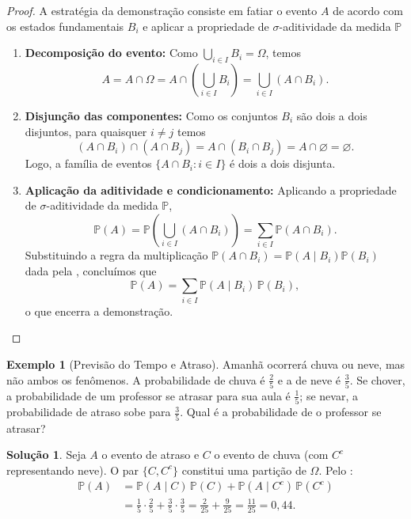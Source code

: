 \documentclass[12pt,portuguese]{article}
\theoremstyle{definition}
\newtheorem{example}[example]{Exemplo}
\newtheorem*{solution}{Solução}
\begin{document}
\begin{proof}
A estratégia da demonstração consiste em fatiar o evento \(A\) de acordo com os estados fundamentais \(B_i\) e aplicar a propriedade de $\sigma$-aditividade da medida \(\mathbb{P}\)

\begin{enumerate}[label=\textbf{Passo \arabic*:},leftmargin=*]
  \item \textbf{Decomposição do evento:} Como \(\bigcup_{i \in I} B_i = \Omega\), temos
  \[
    A = A \cap \Omega = A \cap \left(\bigcup_{i \in I} B_i\right) = \bigcup_{i \in I} (A \cap B_i).
  \]
  \item \textbf{Disjunção das componentes:} Como os conjuntos \(B_i\) são dois a dois disjuntos, para quaisquer \(i \ne j\) temos
  \[
    (A \cap B_i) \cap (A \cap B_j) = A \cap (B_i \cap B_j) = A \cap \varnothing = \varnothing.
  \]
  Logo, a família de eventos \(\{A \cap B_i : i \in I\}\) é dois a dois disjunta.
  \item \textbf{Aplicação da aditividade e condicionamento:} Aplicando a propriedade de $\sigma$-aditividade da medida \(\mathbb{P}\),
  \[
    \mathbb{P}(A) = \mathbb{P}\left(\bigcup_{i \in I} (A \cap B_i)\right) = \sum_{i \in I} \mathbb{P}(A \cap B_i).
  \]
  Substituindo a regra da multiplicação \(\mathbb{P}(A \cap B_i) = \mathbb{P}(A \mid B_i)\mathbb{P}(B_i)\) dada pela , concluímos que
  \[
    \mathbb{P}(A) = \sum_{i \in I} \mathbb{P}(A \mid B_i)\,\mathbb{P}(B_i),
  \]
  o que encerra a demonstração.
\end{enumerate}
\end{proof}

\begin{example}[Previsão do Tempo e Atraso]\label{ex:atraso}
Amanhã ocorrerá chuva ou neve, mas não ambos os fenômenos. A probabilidade de chuva é \(\tfrac{2}{5}\) e a de neve é \(\tfrac{3}{5}\). Se chover, a probabilidade de um professor se atrasar para sua aula é \(\tfrac{1}{5}\); se nevar, a probabilidade de atraso sobe para \(\tfrac{3}{5}\). Qual é a probabilidade de o professor se atrasar?

\begin{solution}
Seja \(A\) o evento de atraso e \(C\) o evento de chuva (com \(C^c\) representando neve). O par \(\{C, C^c\}\) constitui uma partição de \(\Omega\). Pelo :
\[
  \begin{aligned}
    \mathbb{P}(A) &= \mathbb{P}(A \mid C)\,\mathbb{P}(C) + \mathbb{P}(A \mid C^c)\,\mathbb{P}(C^c) \\
    &= \frac{1}{5} \cdot \frac{2}{5} + \frac{3}{5} \cdot \frac{3}{5} = \frac{2}{25} + \frac{9}{25} = \frac{11}{25} = 0{,}44.
  \end{aligned}
\]
\end{solution}
\end{example}
\end{document}
